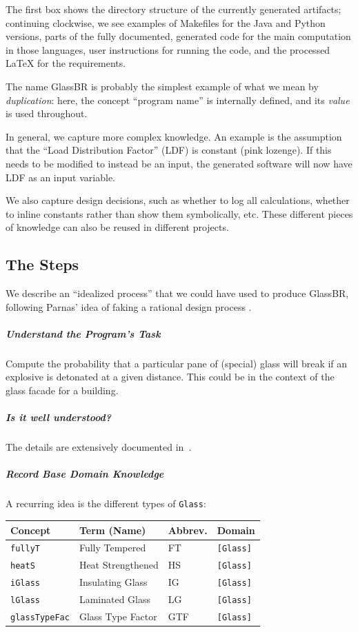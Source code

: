 \documentclass[a4paper,UKenglish,cleveref,autoref,thm-restate]{oasics-v2021}
\begin{document}
The first box shows the directory structure of the currently generated
artifacts; continuing clockwise, we see examples of Makefiles for the Java and
Python versions, parts of the fully documented, generated code for the main
computation in those languages, user instructions for running the code, and the
processed \LaTeX{} for the requirements.

The name GlassBR is probably the simplest example of what we mean by
\emph{duplication}: here, the concept ``program name'' is internally defined, and
its \emph{value} is used throughout. 

In general, we capture more complex knowledge. An example is the assumption
that the ``Load Distribution Factor'' (LDF) is constant (pink lozenge). If this
needs to be modified to instead be an input, the generated software will now
have LDF as an input variable.  

We also capture design decisions, such as
whether to log all calculations, whether to inline constants rather than show
them symbolically, etc. These different pieces of knowledge can also be reused
in different projects.

\subsection{The Steps}
We describe an ``idealized process'' that we could have used to produce GlassBR,
following Parnas' idea of faking a rational design process \cite{Parnas1986}.

\subparagraph*{Understand the Program's Task} Compute the probability that a
particular pane of (special) glass will break if an explosive is detonated at a
given distance.  This could be in the context of the glass facade for a
building.

\subparagraph*{Is it well understood?} The details are extensively documented
in~\cite{ASTM2009, ASTM2015, BeasonEtAl1998}.

\subparagraph*{Record Base Domain Knowledge}
A recurring idea is the different types of \texttt{Glass}:
\begin{center}
  \begin{tabular}{|l|l|l|l|}
    \hline
    \textbf{Concept} & \textbf{Term (Name)} & \textbf{Abbrev.} & \textbf{Domain} \\ \hline
    \texttt{fullyT} & Fully Tempered & FT & \texttt{[Glass]} \\ \hline
    \texttt{heatS} & Heat Strengthened & HS & \texttt{[Glass]} \\ \hline
    \texttt{iGlass} & Insulating Glass & IG & \texttt{[Glass]} \\ \hline
    \texttt{lGlass} & Laminated Glass & LG & \texttt{[Glass]} \\ \hline
    \texttt{glassTypeFac} & Glass Type Factor & GTF & \texttt{[Glass]} \\ \hline
  \end{tabular}
\end{center}
\end{document}
